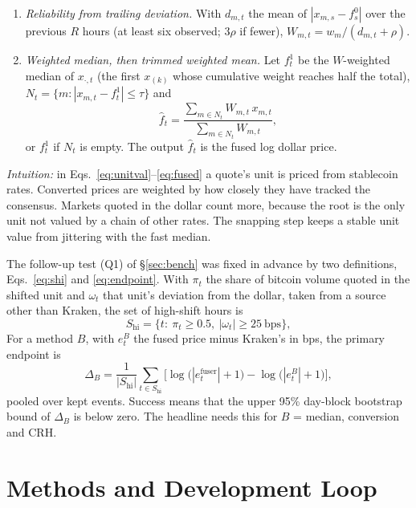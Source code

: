 \documentclass[sigconf,review,anonymous]{acmart}
\begin{document}
\begin{enumerate}
\item \emph{Reliability from trailing deviation.} With $d_{m,t}$ the mean of $|x_{m,s}-f^0_s|$ over the previous $R$ hours (at least six observed;
$3\rho$ if fewer), $W_{m,t}=w_m/(d_{m,t}+\rho)$.
\item \emph{Weighted median, then trimmed weighted mean.} Let $f^1_t$ be the $W$-weighted median of $x_{\cdot,t}$ (the first $x_{(k)}$ whose cumulative weight reaches half the total),
$N_t=\{m:|x_{m,t}-f^1_t|\le\tau\}$ and
\begin{equation}
\hat f_t=\frac{\sum_{m\in N_t}W_{m,t}\,x_{m,t}}{\sum_{m\in N_t}W_{m,t}},
\label{eq:fused}
\end{equation}
or $f^1_t$ if $N_t$ is empty. The output $\hat f_t$ is the fused log dollar price.
\end{enumerate}
\emph{Intuition:} in Eqs.~\eqref{eq:unitval}--\eqref{eq:fused} a quote's unit is priced from stablecoin rates. Converted
prices are weighted by how closely they have tracked the consensus. Markets quoted in the dollar count more, because the root
is the only unit not valued by a chain of other rates. The snapping step keeps a stable unit value from jittering with the
fast median.

The follow-up test (Q1) of \S\ref{sec:bench} was fixed in advance by two definitions, Eqs.~\eqref{eq:shi} and
\eqref{eq:endpoint}. With $\pi_t$ the share of bitcoin volume quoted in the shifted unit and $\omega_t$ that unit's
deviation from the dollar, taken from a source other than Kraken, the set of high-shift hours is
\begin{equation}
S_{\mathrm{hi}}=\{t:\ \pi_t\ge 0.5,\ |\omega_t|\ge 25\ \mathrm{bps}\},
\label{eq:shi}
\end{equation}
For a method $B$, with $e^{B}_t$ the fused price minus Kraken's in bps, the primary endpoint is
\begin{equation}
\Delta_B=\frac{1}{|S_{\mathrm{hi}}|}\sum_{t\in S_{\mathrm{hi}}}\Big[\log\big(|e^{\mathrm{fuser}}_t|+1\big)-\log\big(|e^{B}_t|+1\big)\Big],
\label{eq:endpoint}
\end{equation}
pooled over kept events. Success means that the upper 95\% day-block bootstrap bound of $\Delta_B$ is below zero. The headline
needs this for $B$ = median, conversion and CRH.

\section{Methods and Development Loop}
\label{app:details}
\end{document}
